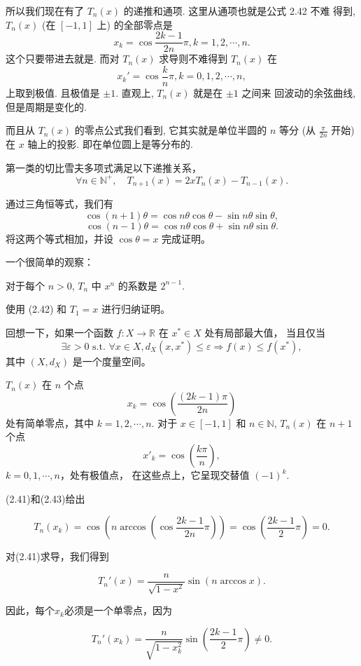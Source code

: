 \documentclass[a4paper]{ctexart}
\begin{document}
{所以我们现在有了 $T_n(x)$ 的递推和通项. 这里从通项也就是公式 2.42 不难
得到, $T_n(x)$ (在 $[-1, 1]$ 上) 的全部零点是
$$
x_k = \cos \frac{2 k - 1}{2n} \pi, k = 1, 2, \cdots, n.
$$
这个只要带进去就是. 而对 $T_n(x)$ 求导则不难得到 $T_n(x)$ 在
$$
x_k' = \cos \frac{k}{n} \pi, k = 0, 1, 2, \cdots, n,
$$
上取到极值. 且极值是 $\pm 1$. 直观上, $T_n(x)$ 就是在 $\pm 1$ 之间来
回波动的余弦曲线, 但是周期是变化的.

而且从 $T_n(x)$ 的零点公式我们看到, 它其实就是单位半圆的 $n$ 等分 (从 $\frac{\pi}{2n}$ 开始) 
在 $x$ 轴上的投影. 即在单位圆上是等分布的. 

 第一类的切比雪夫多项式满足以下递推关系，
\[
\forall n \in \mathbb{N}^+ , \quad T_{n+1}(x) = 2xT_n(x) - T_{n-1}(x). \tag{2.42}
\]

 通过三角恒等式，我们有
\[
\cos(n + 1)\theta = \cos n\theta \cos \theta - \sin n\theta \sin \theta,
\]
\[
\cos(n - 1)\theta = \cos n\theta \cos \theta + \sin n\theta \sin \theta.
\]
将这两个等式相加，并设 $\cos \theta = x$ 完成证明。

一个很简单的观察：

 对于每个 $n > 0$, $T_n$ 中 $x^n$ 的系数是 $2^{n-1}$.

 使用 (2.42) 和 $T_1 = x$ 进行归纳证明。

 回想一下，如果一个函数 $f : X \rightarrow \mathbb{R}$ 在 $x^* \in X$ 处有局部最大值，
当且仅当
\[
\exists \varepsilon > 0 \text{ s.t. } \forall x \in X, d_X(x, x^*) \leq \varepsilon \Rightarrow f(x) \leq f(x^*),
\]
其中 $(X, d_X)$ 是一个度量空间。

 $T_n(x)$ 在 $n$ 个点
\[
x_k = \cos\left(\frac{(2k - 1)\pi}{2n}\right)
\]
处有简单零点，其中 $k = 1, 2, \cdots, n$. 对于 $x \in [-1, 1]$ 和 $n \in \mathbb{N}$, $T_n(x)$ 在 $n + 1$ 个点
\[
x'_{k} = \cos\left(\frac{k\pi}{n}\right),
\]
$k = 0, 1, \cdots, n$，处有极值点，
在这些点上，它呈现交替值 $(-1)^k$.

 (2.41)和(2.43)给出

\[ 
T_n(x_k) = \cos(n \arccos(\cos \frac{2k-1}{2n}\pi)) = \cos(\frac{2k-1}{2}\pi) = 0. 
\]

对(2.41)求导，我们得到

\[ 
T_n'(x) = \frac{n}{\sqrt{1-x^2}}\sin(n \arccos x). 
\]

因此，每个\(x_k\)必须是一个单零点，因为

\[ T_n'(x_k) = \frac{n}{\sqrt{1-x_k^2}}\sin(\frac{2k-1}{2}\pi) \neq 0. \]

}
\end{document}
